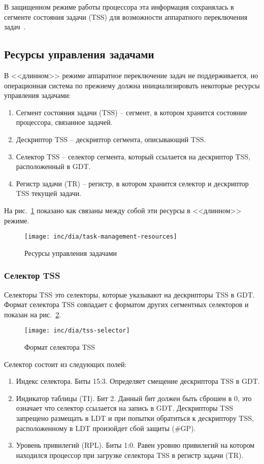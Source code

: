 В защищенном режиме работы процессора эта информация сохранялась в
сегменте состояния задачи (TSS) для возможности аппаратного переключения
задач~\cite[стр. 327]{amd_pm_v2}.

\subsection{Ресурсы управления задачами}
В <<длинном>> режиме аппаратное переключение задач не поддерживается, но
операционная система по прежнему должна инициализировать некоторые ресурсы
управления задачами:
\begin{enumerate}
\item Сегмент состояния задачи (TSS) -- сегмент, в котором хранится состояние
	процессора, связанное задачей.
\item Дескриптор TSS -- дескриптор сегмента, описывающий TSS.
\item Селектор TSS -- селектор сегмента, который ссылается на дескриптор TSS,
	расположенный в GDT.
\item Регистр задачи (TR) -- регистр, в котором хранится селектор и дескриптор
	TSS текущей задачи.
\end{enumerate}

На рис.~\ref{fig:task_management_resources} показано как связаны между собой
эти ресурсы в <<длинном>> режиме.
\begin{figure}
  \centering
  \texttt{[image: inc/dia/task-management-resources]}
  \caption{Ресурсы управления задачами}
  \label{fig:task_management_resources}
\end{figure}

\subsubsection*{Селектор TSS}
Селекторы TSS это селекторы, которые указывают на дескрипторы TSS в GDT.
Формат селектора TSS совпадает с форматом других сегментных селекторов и
показан на рис.~\ref{fig:tss_selector}.

\begin{figure}
  \centering
  \texttt{[image: inc/dia/tss-selector]}
  \caption{Формат селектора TSS}
  \label{fig:tss_selector}
\end{figure}

Селектор состоит из следующих полей:
\begin{enumerate}
\item Индекс селектора. Биты 15:3. Определяет смещение дескриптора TSS в GDT.
\item Индикатор таблицы (TI). Бит 2. Данный бит должен быть сброшен в 0, это
	означает что селектор ссылается на запись в GDT. Дескрипторы TSS
	запрещено размещать в LDT и при попытки обратиться к дескриптору TSS,
	расположенному в LDT произойдет сбой защиты (\#GP).
\item Уровень привилегий (RPL). Биты 1:0. Равен уровню привилегий на котором
	находился процессор при загрузке селектора TSS в регистр задачи (TR).
\end{enumerate}

